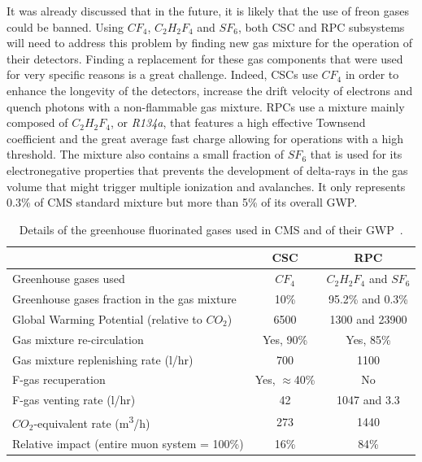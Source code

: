 	It was already discussed that in the future, it is likely that the use of freon gases could be banned. Using $CF_4$, $C_2H_2F_4$ and $SF_6$, both CSC and RPC subsystems will need to address this problem by finding new gas mixture for the operation of their detectors. Finding a replacement for these gas components that were used for very specific reasons is a great challenge. Indeed, CSCs use $CF_4$ in order to enhance the longevity of the detectors, increase the drift velocity of electrons and quench photons with a non-flammable gas mixture. RPCs use a mixture mainly composed of $C_2H_2F_4$, or \textit{R134a}, that features a high effective Townsend coefficient and the great average fast charge allowing for operations with a high threshold. The mixture also contains a small fraction of $SF_6$ that is used for its electronegative properties that prevents the development of delta-rays in the gas volume that might trigger multiple ionization and avalanches. It only represents 0.3\% of CMS standard mixture but more than 5\% of its overall GWP.
	
	\begin{table}[H]
		\centering
		\begin{tabular}{l c c}
			\hline
			 & CSC & RPC\\
			\hline
			Greenhouse gases used & $CF_4$ & $C_2H_2F_4$ and $SF_6$ \\
			Greenhouse gases fraction in the gas mixture & 10\% & 95.2\% and 0.3\% \\
			Global Warming Potential (relative to $CO_2$) & 6500 & 1300 and 23900 \\
			Gas mixture re-circulation & Yes, 90\% & Yes, 85\% \\
			Gas mixture replenishing rate (\si{l/hr}) & 700 & 1100 \\
			F-gas recuperation & Yes, $\approx$40\% & No \\
			F-gas venting rate (\si{l/hr}) & 42 & 1047 and 3.3 \\
			$CO_2$-equivalent rate (\si{m^3/h}) & 273 & 1440 \\
			Relative impact (entire muon system = 100\%) & 16\% & 84\% \\
			\hline
		\end{tabular}
		\caption{\label{tab:F-GAS-CMS} Details of the greenhouse fluorinated gases used in CMS and of their GWP~\cite{PHASEIITP}.}
	\end{table}
	
